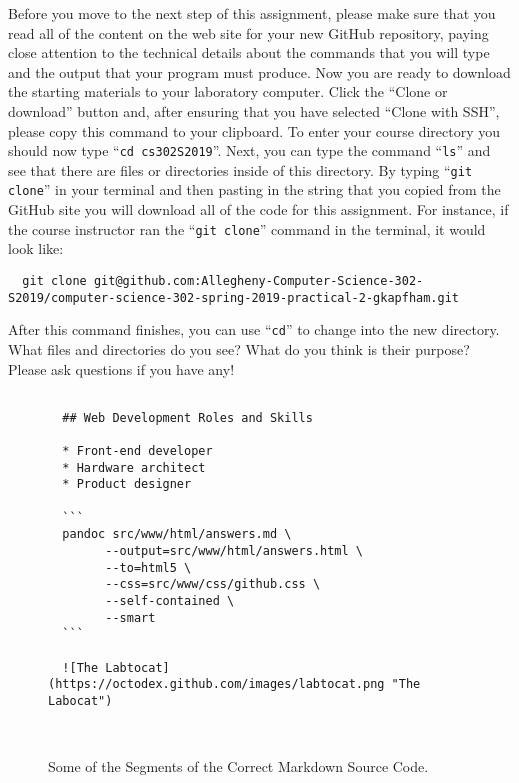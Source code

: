 \documentclass[11pt]{article}
\newcommand{\command}[1]{``\lstinline{#1}''}
\begin{document}
Before you move to the next step of this assignment, please make sure that you read all of the content on the web site
for your new GitHub repository, paying close attention to the technical details about the commands that you will type
and the output that your program must produce. Now you are ready to download the starting materials to your laboratory
computer. Click the ``Clone or download'' button and, after ensuring that you have selected ``Clone with SSH'', please
copy this command to your clipboard. To enter your course directory you should now type \command{cd cs302S2019}. Next,
you can type the command \command{ls} and see that there are files or directories inside of this directory. By typing
\command{git clone} in your terminal and then pasting in the string that you copied from the GitHub site you will
download all of the code for this assignment. For instance, if the course instructor ran the \command{git clone} command
in the terminal, it would look like:

\begin{lstlisting}
  git clone git@github.com:Allegheny-Computer-Science-302-S2019/computer-science-302-spring-2019-practical-2-gkapfham.git
\end{lstlisting}

After this command finishes, you can use \command{cd} to change into the new directory. What files and directories do
you see? What do you think is their purpose? Please ask questions if you have any!

\begin{figure}[t]
  \centering

  \begin{verbatim}

  ## Web Development Roles and Skills

  * Front-end developer
  * Hardware architect
  * Product designer

  ```
  pandoc src/www/html/answers.md \
        --output=src/www/html/answers.html \
        --to=html5 \
        --css=src/www/css/github.css \
        --self-contained \
        --smart
  ```

  ![The Labtocat](https://octodex.github.com/images/labtocat.png "The Labocat")

  \end{verbatim}

  \vspace*{-3em}

  \caption{Some of the Segments of the Correct Markdown Source Code.}~\label{fig:correct}

  \vspace*{-2em}

\end{figure}
\end{document}
